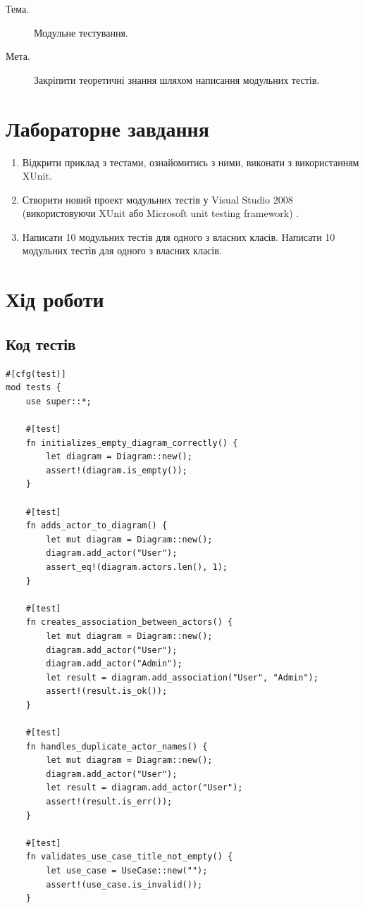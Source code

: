 \documentclass[oneside,14pt]{extarticle}
\newcommand\theme{Модульне тестування}
\newcommand\purpose{Закріпити теоретичні знання шляхом написання модульних
	тестів}
\begin{document}
\begin{normalsize}
	\begin{description}
		\item[Тема.] \theme.
		\item[Мета.] \purpose.
	\end{description}

    \section*{Лабораторне завдання}
    \begin{enumerate}
    	\item Відкрити приклад з тестами, ознайомитись з ними, виконати з використанням XUnit.
    	\item Створити новий проект модульних тестів у Visual Studio 2008 (використовуючи XUnit або Microsoft unit testing framework)
    	.
    	\item Написати 10 модульних тестів для одного з власних класів.
    	Написати 10 модульних тестів для одного з власних класів.
    \end{enumerate}
	\section*{Хід роботи}
	\subsection*{Код тестів}
	\begin{lstlisting}
#[cfg(test)]
mod tests {
	use super::*;
	
	#[test]
	fn initializes_empty_diagram_correctly() {
		let diagram = Diagram::new();
		assert!(diagram.is_empty());
	}
	
	#[test]
	fn adds_actor_to_diagram() {
		let mut diagram = Diagram::new();
		diagram.add_actor("User");
		assert_eq!(diagram.actors.len(), 1);
	}
	
	#[test]
	fn creates_association_between_actors() {
		let mut diagram = Diagram::new();
		diagram.add_actor("User");
		diagram.add_actor("Admin");
		let result = diagram.add_association("User", "Admin");
		assert!(result.is_ok());
	}
	
	#[test]
	fn handles_duplicate_actor_names() {
		let mut diagram = Diagram::new();
		diagram.add_actor("User");
		let result = diagram.add_actor("User");
		assert!(result.is_err());
	}
	
	#[test]
	fn validates_use_case_title_not_empty() {
		let use_case = UseCase::new("");
		assert!(use_case.is_invalid());
	}
	

\end{lstlisting}
\end{normalsize}
\end{document}
